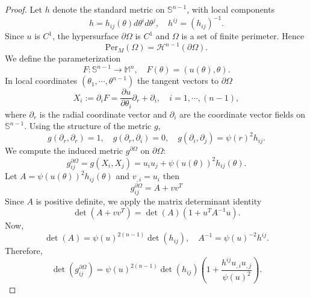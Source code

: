 \documentclass[a4paper,11pt,reqno]{amsart}
\theoremstyle{plain}
\numberwithin{equation}{section} \allowdisplaybreaks
\newcommand{\m}{\mathbb{M}^n}
\newcommand{\sn}{\mathbb{S}^{n-1}}
\begin{document}
\begin{proof}
    Let $h$ denote the standard metric on $\sn$, with local components
    \begin{equation*}
        h=h_{ij}(\theta)d\theta^id\theta^j,\quad h^{ij}=(h_{ij})^{-1}.
    \end{equation*}
    Since $u$ is $C^1$, the hypersurface $\partial \Omega$ is $C^1$ and $\Omega$ is a set of finite perimeter. Hence
    \begin{equation*}
        \text{Per}_{M}(\Omega)=\mathcal{H}^{n-1}(\partial \Omega).
    \end{equation*}
    We define the parameterization 
    \begin{equation*}
        F: \sn\to \m, \quad F(\theta)=(u(\theta),\theta).
    \end{equation*}
    In local coordinates $(\theta_1,\cdots, \theta^{n-1})$ the tangent vectors to $\partial \Omega$ 
    \begin{equation*}
        X_i:=\partial_i F=\frac{\partial u}{\partial \theta_i}\partial_r+\partial_i,\quad i=1,\cdots, (n-1),
    \end{equation*}
    where $\partial_r$ is the radial coordinate vector and $\partial_i$  are the coordinate vector fields on $\sn$.
Using the structure of the metric $g$,
\begin{equation*}
    g(\partial_r, \partial_r)=1,\quad g(\partial_r, \partial_i)=0,\quad g(\partial_i,\partial_j)=\psi(r)^2h_{ij}.
\end{equation*}
We compute the induced metric $g^{\partial \Omega}$ on $\partial \Omega$: 
\begin{equation*}
    g_{ij}^{\partial \Omega}= g(X_i, X_j)= u_iu_j+\psi(u(\theta))^2h_{ij}(\theta).
\end{equation*}
Let $A=\psi(u(\theta))^2h_{ij}(\theta)$ and $v_{,i}=u_i$ then
\begin{equation*}
    g_{ij}^{\partial \Omega}=A+vv^{T}
\end{equation*}
Since $A$ is positive definite, we apply the matrix determinant identity
\begin{equation*}
    \det(A+vv^T)=\det(A)(1+u^TA^{-1}u).
\end{equation*}
   Now,
   \begin{equation*}
     \det(A)= \psi(u)^{2(n-1)} \det(h_{ij}),\quad A^{-1}=\psi(u)^{-2}h^{ij}.
   \end{equation*}
Therefore,
\begin{equation*}
    \det(g_{ij}^{\partial \Omega})=\psi(u)^{2(n-1)} \det(h_{ij})\left(1+\frac{h^{ij}u_{,i}u_{,j}}{\psi(u)^2}\right).

\end{equation*}
\end{proof}
\end{document}
